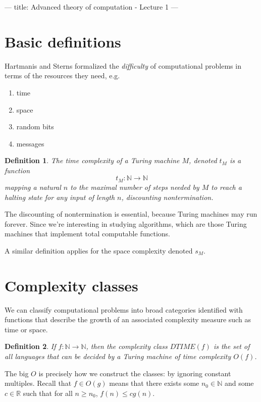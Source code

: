 ---
title: Advanced theory of computation - Lecture 1
---

\section{Basic definitions}

\newtheorem{definition}{Definition}
\newtheorem{proposition}{Proposition}

Hartmanis and Sterns formalized the \emph{difficulty} of computational problems
in terms of the resources they need, e.g.
\begin{enumerate}
    \item time
    \item space
    \item random bits
    \item messages
\end{enumerate}

\begin{definition}
    The \emph{time complexity} of a Turing machine $M$, denoted $t_M$ is a
    function
    $$
    t_M : \mathbb{N} \to \mathbb{N}
    $$
    mapping a natural $n$ to the maximal number of steps needed by $M$ to reach
    a halting state for any input of length $n$, \emph{discounting
    nontermination}.
\end{definition}

The discounting of nontermination is essential, because Turing machines may run
forever. Since we're interesting in studying algorithms, which are those Turing
machines that implement total computable functions.

A similar definition applies for the space complexity denoted $s_M$.

\section{Complexity classes}

We can classify computational problems into broad categories identified with
functions that describe the growth of an associated complexity measure such as
time or space.

\begin{definition}
    If $f : \mathbb{N} \to \mathbb{N}$, then the complexity class $DTIME(f)$ is
    the set of all languages that can be decided by a Turing machine of time
    complexity $O(f)$.
\end{definition}

The big $O$ is precisely how we construct the classes: by ignoring constant
multiples. Recall that $f \in O(g)$ means that there exists some $n_0 \in
\mathbb{N}$ and some $c \in \mathbb{R}$ such that for all $n \geq n_0$, $f(n)
\leq c g(n)$.


